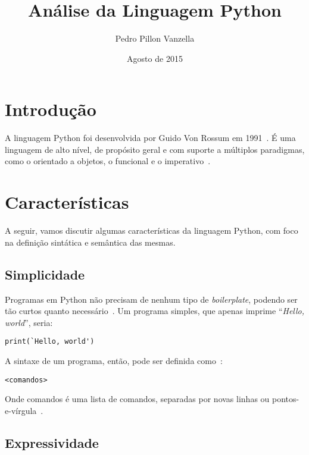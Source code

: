 \documentclass[12pt]{article}
\title{Análise da Linguagem Python}
\author{Pedro Pillon Vanzella}
\date{Agosto de 2015}
\begin{document}
 

\maketitle
     
\section{Introdução}\label{sec:introducao}

A linguagem Python foi desenvolvida por Guido Von Rossum em 1991~\cite{venners:2003}. É uma
linguagem de alto nível, de propósito geral e com suporte a múltiplos
paradigmas, como o orientado a objetos, o funcional e o imperativo~\cite{Rossum:1995:PRM:869369}.

\section{Características}\label{sec:caracteristicas}

A seguir, vamos discutir algumas características da linguagem Python, com foco
na definição sintática e semântica das mesmas.

\subsection{Simplicidade}\label{sec:simplicidade}

Programas em Python não precisam de nenhum tipo de \textit{boilerplate}, podendo
ser tão curtos quanto necessário~\cite{Rossum:1995:PRM:869369}. Um programa simples, que apenas imprime
``\textit{Hello, world}'', seria:

\begin{lstlisting}
print(`Hello, world')
\end{lstlisting}

A sintaxe de um programa, então, pode ser definida como~\cite{Rossum:1995:PRM:869369}:

\begin{lstlisting}
<comandos>
\end{lstlisting}

Onde \textsf{comandos} é uma lista de \textsf{comando}s, separadas por novas
linhas ou pontos-e-vírgula~\cite{Rossum:1995:PRM:869369}.

\subsection{Expressividade}\label{sec:expressividade}
\end{document}
